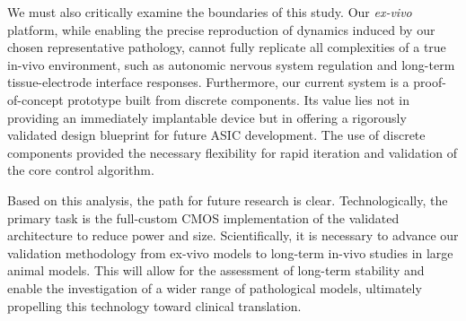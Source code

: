 \documentclass[journal]{IEEEtran}
\begin{document}
We must also critically examine the boundaries of this study. Our \textit{ex-vivo} platform, while enabling the precise reproduction of dynamics induced by our chosen representative pathology, cannot fully replicate all complexities of a true in-vivo environment, such as autonomic nervous system regulation and long-term tissue-electrode interface responses. Furthermore, our current system is a proof-of-concept prototype built from discrete components. Its value lies not in providing an immediately implantable device but in offering a rigorously validated design blueprint for future ASIC development. The use of discrete components provided the necessary flexibility for rapid iteration and validation of the core control algorithm.

Based on this analysis, the path for future research is clear. Technologically, the primary task is the full-custom CMOS implementation of the validated architecture to reduce power and size. Scientifically, it is necessary to advance our validation methodology from ex-vivo models to long-term in-vivo studies in large animal models. This will allow for the assessment of long-term stability and enable the investigation of a wider range of pathological models, ultimately propelling this technology toward clinical translation.
%
%
%
\end{document}

